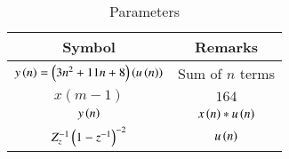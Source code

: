 \setlength{\arrayrulewidth}{0.3mm}
\setlength{\tabcolsep}{15pt}
\renewcommand{\arraystretch}{1.4}

\begin{table}[ht]
\centering

\begin{tabular}{|c|c|}
\hline

\textbf{Symbol} & \textbf{Remarks}\\
\hline
$y\left(n\right) =\left(3n^2+11n+8\right)\left(u\left(n\right)\right)$ & Sum of $n$ terms  \\
\hline
$x(m-1)$ & $164$\\
\hline
$y\left(n\right)$ & $x\left(n\right) * u\left(n\right)$\\
\hline
$Z_{z}^{-1}\left(1-z^{-1}\right)^{-2}$ & $u\left(n\right)$\\
\hline

\end{tabular}
\vspace{0.25cm}
\caption{Parameters}



\end{table}
